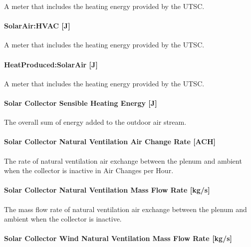 A meter that includes the heating energy provided by the UTSC.

\paragraph{SolarAir:HVAC {[}J{]}}\label{solarairhvac-j}

A meter that includes the heating energy provided by the UTSC.

\paragraph{HeatProduced:SolarAir {[}J{]}}\label{heatproducedsolarair-j}

A meter that includes the heating energy provided by the UTSC.

\paragraph{Solar Collector Sensible Heating Energy {[}J{]}}\label{solar-collector-sensible-heating-energy-j}

The overall sum of energy added to the outdoor air stream.

\paragraph{Solar Collector Natural Ventilation Air Change Rate {[}ACH{]}}\label{solar-collector-natural-ventilation-air-change-rate-ach}

The rate of natural ventilation air exchange between the plenum and ambient when the collector is inactive in Air Changes per Hour.

\paragraph{Solar Collector Natural Ventilation Mass Flow Rate {[}kg/s{]}}\label{solar-collector-natural-ventilation-mass-flow-rate-kgs}

The mass flow rate of natural ventilation air exchange between the plenum and ambient when the collector is inactive.

\paragraph{Solar Collector Wind Natural Ventilation Mass Flow Rate {[}kg/s{]}}\label{solar-collector-wind-natural-ventilation-mass-flow-rate-kgs}

